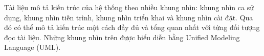 \documentclass[./../main_file.tex]{subfiles}
\begin{document}
	Tài liệu mô tả kiến trúc của hệ thống theo nhiều khung nhìn: khung nhìn ca sử dụng, khung nhìn tiến trình, khung nhìn triển khai và khung nhìn cài đặt. Qua đó có thể mô tả kiến trúc một cách đầy đủ và tổng quan nhất với từng đối tượng đọc tài liệu. Những khung nhìn trên được biểu diễn bằng Unified Modeling Language (UML).
\end{document}
